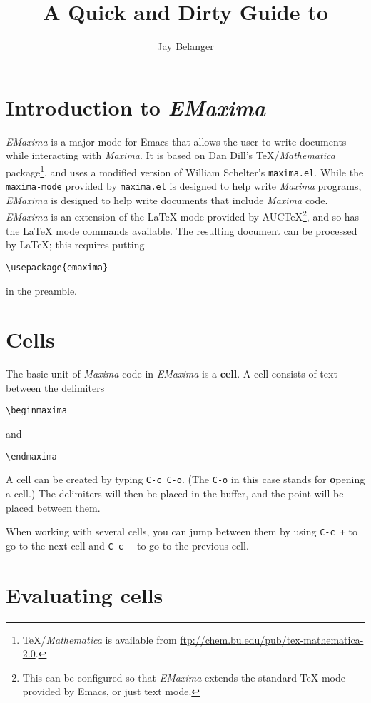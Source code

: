 \documentclass{article}
\title{A Quick and Dirty Guide to \emx{}}
\author{Jay Belanger}
\date{}
\newcommand{\emx}{\textsl{\sffamily EMaxima}}
\newcommand{\mx}{\textsl{\sffamily Maxima}}
\begin{document}
\maketitle

\section{Introduction to \emx}

\emx{} is a major mode for Emacs that allows the user to write documents
while interacting with \mx.  It is based on Dan Dill's
\TeX{}/\textit{Mathematica} package\footnote{\TeX/\textit{Mathematica} is
available from \url{ftp://chem.bu.edu/pub/tex-mathematica-2.0}.}, and
uses a modified version of William Schelter's
\texttt{maxima.el}.
While the \texttt{maxima-mode} provided by \texttt{maxima.el} is designed
to help write \mx{} programs, \emx{} is designed to help write
documents that include \mx{} code.  \emx{} is an extension of the
\LaTeX{} mode provided by AUC\TeX{}\footnote{This can be configured so
that \emx{} extends the standard \TeX{} mode provided by Emacs, or just
text mode.}, and so has the \LaTeX{} mode commands available.  The
resulting document can be processed by \LaTeX{}; this requires putting 
\begin{verbatim}
\usepackage{emaxima}
\end{verbatim}
\noindent
in the preamble.

\section{Cells}

The basic unit of \mx{} code in \emx{} is a \textbf{cell}.  A cell
consists of text between the delimiters
\begin{verbatim}
\beginmaxima
\end{verbatim}
\noindent
and
\begin{verbatim}
\endmaxima
\end{verbatim}
\noindent
A cell can be created by typing \texttt{C-c C-o}.  (The \texttt{C-o} in this
case stands for \textbf{o}pening a cell.)  The delimiters will then be
placed in the buffer, and the point will be placed between them.

When working with several cells, you can jump between them by using
\texttt{C-c +} to go to the next cell and \texttt{C-c -} to go to the
previous cell.

\section{Evaluating cells}
\end{document}

